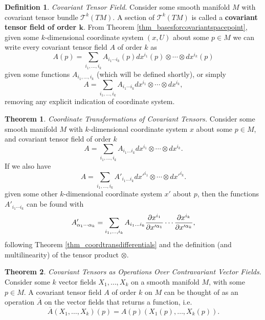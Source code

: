 \documentclass[10pt,landscape]{article}
\theoremstyle{definition}
\newtheorem{definition}{Definition}[section]
\theoremstyle{theorem}
\newtheorem{theorem}{Theorem}[section]
\theoremstyle{summary}
\theoremstyle{remark}
\begin{document}
\begin{multicols*}{3}
\theoremstyle{definition}
\begin{definition}{\textit{Covariant Tensor Field.}}
    Consider some smooth manifold $M$ with covariant tensor bundle $\mathcal{T}^k(TM)$. A section of $\mathcal{T}^k(TM)$ is called a \textbf{covariant tensor field of order $\bm{k}$}. From Theorem \ref{thm_basesforcovariantspacepoint}, given some $k$-dimensional coordinate system $(x ,U)$ about some $p\in M$ we can write every covariant tensor field $A$ of order $k$ as
    \begin{equation}
        A(p) = \sum\limits_{i_1,\ldots,i_k}A_{i_1\cdots i_k}(p)dx^{i_1}(p)\otimes\cdots\otimes dx^{i_k}(p)
    \end{equation}
    given some functions $A_{i_1,\ldots,i_k}$ (which will be defined shortly), or simply
    \begin{equation}
        A = \sum\limits_{i_1,\ldots,i_k}A_{i_1\cdots i_k}dx^{i_1}\otimes\cdots\otimes dx^{i_k},
    \end{equation}
    removing any explicit indication of coordinate system.
\end{definition}

\theoremstyle{theorem}
\begin{theorem}{\textit{Coordinate Transformations of Covariant Tensors.}}
    Consider some smooth manifold $M$ with $k$-dimensional coordinate system $x$ about some $p\in M$, and covariant tensor field of order $k$
    \begin{equation}
        A = \sum\limits_{i_1,\ldots,i_k}A_{i_1\ldots i_k}dx^{i_1}\otimes\cdots\otimes dx^{i_k}.
    \end{equation}
    If we also have
    \begin{equation}
        A = \sum\limits_{i_1,\ldots,i_k}A'_{i_1\ldots i_k}dx'^{i_1}\otimes\cdots\otimes dx'^{i_k}.
    \end{equation}
    given some other $k$-dimensional coordinate system $x'$ about $p$, then the functions $A'_{i_1\cdots i_k}$ can be found with
    \begin{equation}
        A'_{\alpha_1\cdots\alpha_k} = \sum\limits_{i_1,\ldots,i_k}A_{i_1\ldots i_k} \pdv{x^{i_1}}{x'^{\alpha_1}}\cdots\pdv{x^{i_k}}{x'^{\alpha_k}},
    \end{equation}
    following Theorem \ref{thm_coordtransdifferentials} and the definition (and multilinearity) of the tensor product $\otimes$.
\end{theorem}

\theoremstyle{theorem}
\begin{theorem}{\textit{Covariant Tensors as Operations Over Contravariant Vector Fields.}}
    \label{thm_covtensorsoperations}
    Consider some $k$ vector fields $X_1,\ldots,X_k$ on a smooth manifold $M$, with some $p\in M$. A covariant tensor field $A$ of order $k$ on $M$ can be thought of as an operation $\overline{A}$ on the vector fields that returns a function, i.e.
    \begin{equation}
        \overline{A}(X_1,\ldots,X_k)(p) = A(p)(X_1(p),\ldots,X_k(p)).
    \end{equation}
    

\end{theorem}
\end{multicols*}
\end{document}
